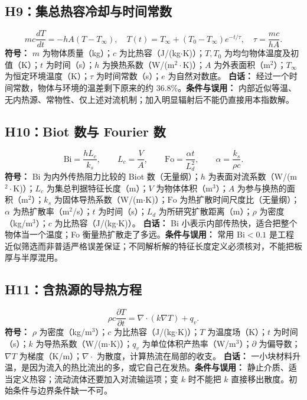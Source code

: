 \documentclass[UTF8,zihao=-4,openany,oneside,fontset=windows]{ctexbook}
\begin{document}
\subsection{H9：集总热容冷却与时间常数}
\begin{equation}
mc\frac{dT}{dt}=-hA(T-T_\infty),\quad T(t)=T_\infty+(T_0-T_\infty)e^{-t/\tau},\quad \tau=\frac{mc}{hA}.
\end{equation}
\textbf{符号：} $m$ 为物体质量（kg）；$c$ 为比热容（J/(kg$\cdot$K)）；$T,T_0$ 为均匀物体温度及初值（K）；$t$ 为时间（s）；$h$ 为换热系数（W/(m$^2\cdot$K)）；$A$ 为外表面积（m$^2$）；$T_\infty$ 为恒定环境温度（K）；$\tau$ 为时间常数（s）；$e$ 为自然对数底。
\textbf{白话：} 经过一个时间常数，物体与环境的温差剩下原来的约 36.8\%。\textbf{条件与误用：} 内部近似等温、无内热源、常物性、仅上述对流机制；加入明显辐射后不能仍直接用本指数解。

\subsection{H10：Biot 数与 Fourier 数}
\begin{equation}
\mathrm{Bi}=\frac{hL_c}{k_s},\qquad L_c=\frac VA,\qquad \mathrm{Fo}=\frac{\alpha t}{L_d^2},\qquad \alpha=\frac{k_s}{\rho c}.
\end{equation}
\textbf{符号：} $\mathrm{Bi}$ 为内外传热阻力比较的 Biot 数（无量纲）；$h$ 为表面对流系数（W/(m$^2\cdot$K)）；$L_c$ 为集总判据特征长度（m）；$V$ 为物体体积（m$^3$）；$A$ 为参与换热的面积（m$^2$）；$k_s$ 为固体导热系数（W/(m$\cdot$K)）；$\mathrm{Fo}$ 为热扩散时间尺度比（无量纲）；$\alpha$ 为热扩散率（m$^2$/s）；$t$ 为时间（s）；$L_d$ 为所研究扩散距离（m）；$\rho$ 为密度（kg/m$^3$）；$c$ 为比热容（J/(kg$\cdot$K)）。
\textbf{白话：} Bi 小表示内部传热快，适合把整个物体当一个温度；Fo 衡量热扩散走了多远。\textbf{条件与误用：} 常用 $\mathrm{Bi}<0.1$ 是工程近似筛选而非普适严格误差保证；不同解析解的特征长度定义必须核对，不能把板厚与半厚混用。

\subsection{H11：含热源的导热方程}
\begin{equation}
\rho c\frac{\partial T}{\partial t}=\nabla\cdot(k\nabla T)+q_v.
\end{equation}
\textbf{符号：} $\rho$ 为密度（kg/m$^3$）；$c$ 为比热容（J/(kg$\cdot$K)）；$T$ 为温度场（K）；$t$ 为时间（s）；$k$ 为导热系数（W/(m$\cdot$K)）；$q_v$ 为单位体积产热率（W/m$^3$）；$\partial$ 为偏导数；$\nabla T$ 为梯度（K/m）；$\nabla\cdot$ 为散度，计算热流在局部的收支。
\textbf{白话：} 一小块材料升温，是因为流入的热比流出的多，或它自己在发热。\textbf{条件与误用：} 静止介质、适当定义热容；流动流体还要加入对流输运项；变 $k$ 时不能把 $k$ 直接移出散度。初始条件与边界条件缺一不可。
\end{document}
